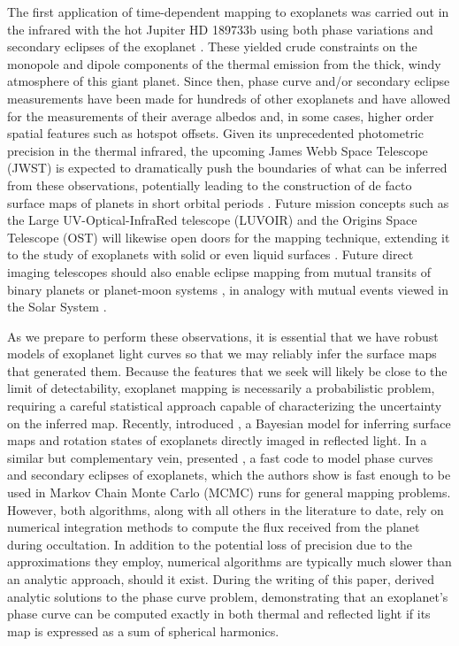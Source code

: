 \documentclass[modern]{aastex61}
\begin{document}
The first application of time-dependent mapping to exoplanets was carried out in the
infrared with the hot Jupiter HD 189733b using both phase variations and
secondary eclipses of the exoplanet \citep{Knutson2007,Majeau2012,deWit2012}.
These yielded crude constraints on the monopole and dipole components of the thermal
emission from the thick, windy atmosphere of this giant planet.
%
Since then, phase curve and/or secondary eclipse measurements have been made for
hundreds of other exoplanets \citep[e.g.,][]{Shabram2016, Jansen2017, Adams2018} and have allowed for
the measurements of their average albedos and, in some cases, higher order spatial features
such as hotspot offsets. Given its unprecedented photometric precision in the thermal infrared,
the upcoming James Webb Space Telescope (JWST) is expected to dramatically push the boundaries of
what can be inferred from these observations, potentially leading to the construction of de facto
surface maps of planets in short orbital periods \citep{Beichman2014,Schlawin2018}.
%
Future mission concepts such as the Large UV-Optical-InfraRed telescope (LUVOIR) and the
Origins Space Telescope (OST) will likewise open doors for the mapping technique,
extending it to the study of exoplanets with solid or even liquid surfaces
\citep[e.g.,][]{KawaharaFujii2010,KawaharaFujii2011,FujiiKawahara2012,Cowan2012,CowanFuentesHaggard2013,CowanFujii2017,Fujii2017,LugerLustigYaegerAgol2017,BerdyuginaKuhn2017}.
Future direct imaging telescopes should also enable eclipse mapping from
mutual transits of binary planets or planet-moon systems \citep{Cabrera2007},
in analogy with mutual events viewed in the Solar System
\citep{Brinkmann1973,Vermilion1974,Herzog1975,Brinkmann1976,Reinsch1994,Young1999,
Young2001,Livengood2011}.

As we prepare to perform these observations, it is essential that we have
robust models of exoplanet light curves so
that we may reliably infer the surface maps that generated them. Because the
features that we seek will likely be close to the limit of detectability,
exoplanet mapping is necessarily a probabilistic problem, requiring
a careful statistical approach capable of characterizing the uncertainty
on the inferred map. Recently, \citet{Farr2018} introduced \exocartographer,
a Bayesian model for inferring surface maps and rotation states
of exoplanets directly imaged in reflected light. In a similar but
complementary vein, \citet{Louden2018} presented \spiderman, a fast
code to model phase curves and secondary eclipses of exoplanets, which
the authors show is fast enough to be used in Markov Chain Monte Carlo
(MCMC) runs for general mapping problems. However, both algorithms, along with all
others in the literature to date, rely on numerical integration methods to compute
the flux received from the planet during occultation. In addition to
the potential loss of precision due to the approximations they employ,
numerical algorithms are typically much slower than an analytic
approach, should it exist. During the writing of this paper, \citet{Haggard2018} derived
analytic solutions to the phase curve problem, demonstrating that an
exoplanet's phase curve can be computed exactly in both thermal and
reflected light if its map is expressed as a sum of spherical harmonics.
\end{document}
